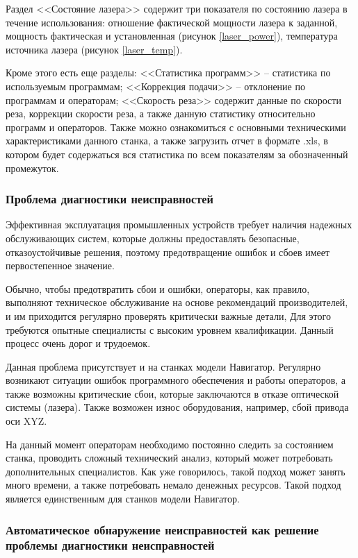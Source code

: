 Раздел <<Состояние лазера>> содержит три показателя по
состоянию лазера в течение использования:
отношение фактической мощности лазера к заданной,
мощность фактическая и установленная (рисунок \ref{laser_power}), температура источника лазера (рисунок \ref{laser_temp}).

Кроме этого есть еще разделы:
<<Статистика программ>> -- статистика по используемым программам;
<<Коррекция подачи>> -- отклонение по программам и операторам;
<<Скорость реза>> содержит данные по скорости реза,
коррекции скорости реза, а также данную статистику относительно программ и операторов.
Также можно ознакомиться с основными техническими характеристиками данного станка,
а также загрузить отчет в формате .xls, в котором будет содержаться вся статистика
по всем показателям за обозначенный промежуток.

\subsubsection{Проблема диагностики неисправностей}

Эффективная эксплуатация промышленных устройств
требует наличия надежных обслуживающих систем,
которые должны предоставлять безопасные, отказоустойчивые решения,
поэтому предотвращение ошибок и сбоев имеет первостепенное значение.

Обычно, чтобы предотвратить сбои и ошибки, операторы,
как правило, выполняют техническое обслуживание 
на основе рекомендаций производителей, 
и им приходится регулярно проверять критически важные детали,
Для этого требуются опытные специалисты с высоким уровнем квалификации.
Данный процесс очень дорог и трудоемок.

Данная проблема присутствует и на станках модели Навигатор.
Регулярно возникают ситуации ошибок программного обеспечения
и работы операторов, а также возможны критические сбои,
которые заключаются в отказе оптической системы (лазера).
Также возможен износ оборудования,
например, сбой привода оси XYZ.

На данный момент операторам необходимо постоянно следить за состоянием
станка, проводить сложный технический анализ,
который может потребовать дополнительных специалистов.
Как уже говорилось, такой подход может занять много времени,
а также потребовать немало денежных ресурсов.
Такой подход является единственным для станков модели Навигатор.


\subsubsection{Автоматическое обнаружение неисправностей как решение проблемы диагностики неисправностей}

